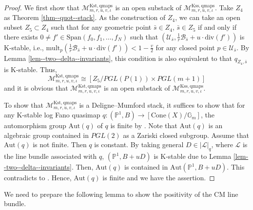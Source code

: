 \documentclass[12pt,twoside]{amsart}
\theoremstyle{definition}
\begin{document}
\begin{proof}
    We first show that $\mathcal{M}^{\mathrm{Kst,qmaps}}_{m,r,u,v,\iota}$ is an open substack of $\mathcal{M}^{\mathrm{Kss,qmaps}}_{m,r,u,v,\iota}$.
    Take $Z_4$ as Theorem \ref{thm--quot--stack}.
    As the construction of $Z_4$, we can take an open subset $Z_5\subset Z_4$ such that  for any geometric point $\bar{s}\in Z_4$, $\bar{s}\in Z_5$ if and only if there exists $0\ne f'\in \mathrm{Span}(f_0,f_1,\ldots,f_N)$ such that $(\mathcal{U}_{\overline{s}},\frac{1}{r}\mathcal{B}_{\bar{s}}+u\cdot \mathrm{div}(f'))$ is K-stable, i.e., $\mathrm{mult}_p(\frac{1}{r}\mathcal{B}_{\bar{s}}+u\cdot \mathrm{div}(f'))< 1-\frac{v}{2}$ for any closed point $p\in \mathcal{U}_{\bar{s}}$.
    By Lemma \ref{lem--two--delta--invariants}, this condition is also equivalent to that $q_{Z_4,\bar{s}}$ is K-stable.
    Thus,
    $$\mathcal{M}^{\mathrm{Kst,qmaps}}_{m,r,u,v,\iota}\cong [Z_5/PGL(P(1))\times PGL(m+1)]$$
    and it is obvious that $\mathcal{M}^{\mathrm{Kst,qmaps}}_{m,r,u,v,\iota}$ is an open substack of $\mathcal{M}^{\mathrm{Kss,qmaps}}_{m,r,u,v,\iota}$.

To show that $\mathcal{M}^{\mathrm{Kst,qmaps}}_{m,r,u,v,\iota}$ is a Deligne--Mumford stack, it suffices to show that for any K-stable log Fano quasimap $q\colon (\mathbb{P}^1,B)\to [\mathrm{Cone}(X)/\mathbb{G}_m]$, the automorphism group $\mathrm{Aut}(q)$ of $q$ is finite by \cite[Corollary 8.4.2]{Ols}.
Note that $\mathrm{Aut}(q)$ is an algebraic group contained in $PGL(2)$ as a Zariski closed subgroup.
Assume that $\mathrm{Aut}(q)$ is not finite. 
Then $q$ is constant.
By taking general $D\in|\mathscr{L}|_q$, where $\mathscr{L}$ is the line bundle associated with $q$, $(\mathbb{P}^1,B+uD)$ is K-stable due to Lemma \ref{lem--two--delta--invariants}.
Then, $\mathrm{Aut}(q)$ is contained in $\mathrm{Aut}(\mathbb{P}^1,B+uD)$. 
This contradicts to \cite[Corollary 1.3]{BX}.
Hence, $\mathrm{Aut}(q)$ is finite and we have the assertion.
\end{proof}

We need to prepare the following lemma to show the positivity of the CM line bundle.
\end{document}
